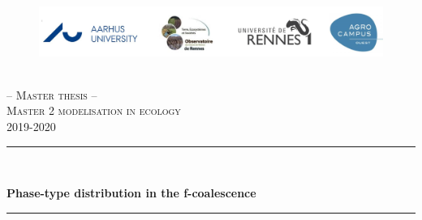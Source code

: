\begin{titlepage}

\clearpage

\newcommand{\HRule}{\rule{\linewidth}{0.5mm}} %

\center %
 

\begin{figure}[t]
\centering
    \vspace*{-0.4in}
    \hspace*{-0.4in}
	\includegraphics[width=1.1\columnwidth]{logo.jpg}
\end{figure}\\[1.5cm]

\vspace*{+0.5in}
\textsc{\LARGE --  Master thesis  --}\\
\vspace*{.4in}
\textsc{\Large \textsc{Master 2 modelisation in ecology}}\\[0.5cm] %
{\Large \textsc{2019-2020}}
\vspace*{.3in}


\HRule \\[0.4cm]
\begin{spacing}{2.0}
{ \huge \bfseries Phase-type distribution in the f-coalescence}\\[0.4cm] %
\end{spacing}
\HRule \\[0.7cm]
 


\end{titlepage}
